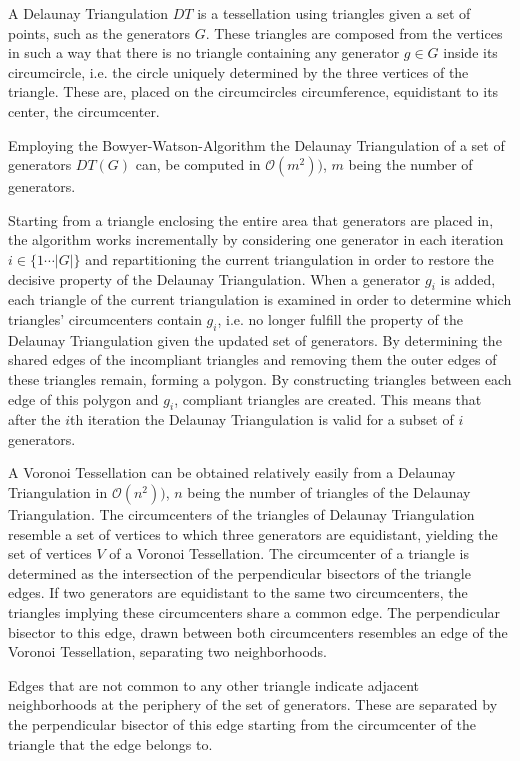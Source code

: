 \documentclass[a4paper]{article}
\begin{document}
A Delaunay Triangulation \(DT\) is a tessellation using triangles given a set of points, such as the generators \(G\).
These triangles are composed from the vertices in such a way that there is no triangle
containing any generator \(g \in G\) inside its circumcircle, i.e. the circle uniquely determined by
the three vertices of the triangle. These are, placed on the circumcircles circumference,
equidistant to its center, the circumcenter.

Employing the Bowyer-Watson-Algorithm the Delaunay Triangulation of a set of generators \(DT(G)\) can,
be computed in \(\mathcal{O}(m^2))\), \(m\) being the number of generators.

Starting from a triangle enclosing
the entire area that generators are placed in, the algorithm works incrementally
by considering one generator in each iteration \(i \in \{1 \cdots |G|\}\) and repartitioning the current
triangulation in order to restore the decisive property of the Delaunay Triangulation. When a generator \(g_i\) is added,
each triangle of the current
triangulation is examined in order to determine which triangles' circumcenters contain \(g_i\), i.e. no longer
fulfill the property of the Delaunay Triangulation given the updated set of generators. By determining the shared
edges of the incompliant triangles and removing them the outer edges of these triangles remain, forming a
polygon. By constructing triangles between each edge of this polygon and \(g_i\), compliant triangles are created.
This means that after the \(i\)th iteration the Delaunay Triangulation is valid for a subset of \(i\)
generators.

A Voronoi Tessellation can be obtained relatively easily from a Delaunay Triangulation
in \(\mathcal{O}(n^2))\), \(n\) being the number of triangles of the Delaunay Triangulation.
The circumcenters of the triangles of Delaunay Triangulation resemble a set of vertices
to which three generators are equidistant, yielding the set of vertices \(V\) of a
Voronoi Tessellation. The circumcenter of a triangle is determined as the intersection of the perpendicular bisectors
of the triangle edges. If two generators are equidistant to the same two circumcenters,
the triangles implying these circumcenters share a common edge. The perpendicular bisector to this edge,
drawn between both circumcenters resembles an edge of the Voronoi Tessellation, separating two neighborhoods.

Edges that are not common to any other triangle
indicate adjacent neighborhoods at the periphery of the set of generators.
These are separated by the perpendicular bisector of this edge starting from the circumcenter of the triangle
that the edge belongs to.
\end{document}
